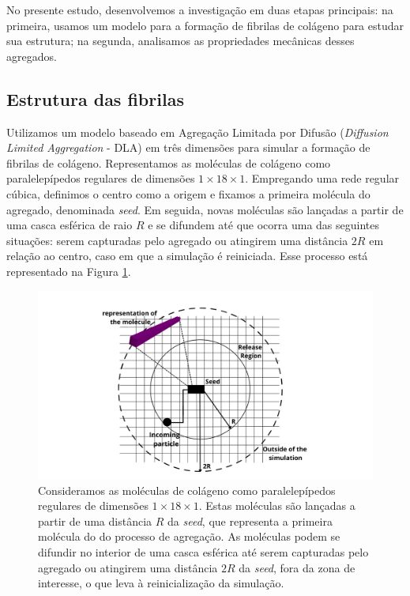 \documentclass{article}
\begin{document}
    No presente estudo, desenvolvemos a investigação em duas etapas principais: na primeira, usamos um modelo para a formação de 
    fibrilas de colágeno para estudar sua estrutura; na segunda, analisamos as propriedades mecânicas desses agregados. 

    \subsection{Estrutura das fibrilas}

    Utilizamos um modelo baseado em Agregação Limitada por Difusão (\textit{Diffusion Limited Aggregation} - DLA) \cite{Witten1983} 
    em três dimensões para simular a formação de fibrilas de colágeno. Representamos as moléculas de colágeno como paralelepípedos 
    regulares de dimensões \(1 \times 18 \times 1\). Empregando uma rede regular cúbica, definimos o centro como a origem e fixamos 
    a primeira molécula do agregado, denominada \textit{seed}. Em seguida, novas moléculas são lançadas a partir de uma casca esférica
    de raio \(R\) e se difundem até que ocorra uma das seguintes situações: serem capturadas pelo agregado ou atingirem uma distância 
    \(2R\) em relação ao centro, caso em que a simulação é reiniciada. Esse processo está representado na Figura \ref{M1}. 

        \begin{figure}[H]
            \centering
            \includegraphics[width=\textwidth]{figures/DLA.png}
    
            \caption{Consideramos as moléculas de colágeno como paralelepípedos regulares de dimensões \(1 \times 18 \times 1\). 
            Estas moléculas são lançadas a partir de uma distância \(R\) da \textit{seed}, que representa a primeira molécula do
            do processo de agregação. As moléculas podem se difundir no interior de uma casca esférica até serem capturadas pelo 
            agregado ou atingirem uma distância \(2R\) da \textit{seed}, fora da zona de interesse, o que leva à reinicialização da simulação.} 
    
            \label{M1}
        \end{figure}
    
\end{document}
